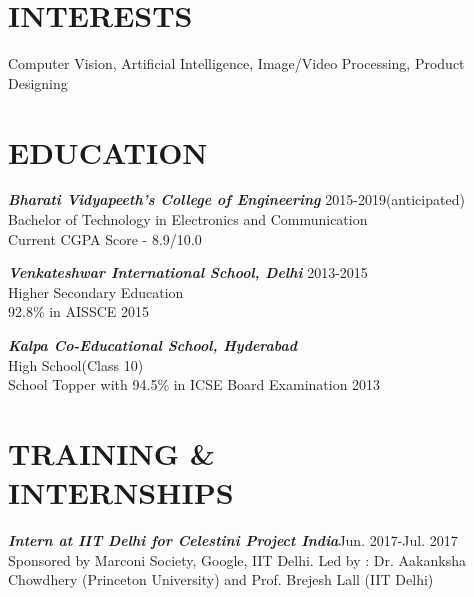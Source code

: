 \documentclass[margin, 10pt]{res} %
\begin{document}
\begin{resume}

 
\section{INTERESTS}  

Computer Vision, Artificial Intelligence, Image/Video Processing, Product Designing

\section{EDUCATION} 
{\sl \bf{Bharati Vidyapeeth's College of Engineering}} \hfill 2015-2019(anticipated)\\ Bachelor of Technology in Electronics and Communication\\
Current CGPA Score - 8.9/10.0

{\sl \bf{Venkateshwar International School, Delhi}}
\hfill 2013-2015 \\Higher Secondary Education\\ 92.8\% in AISSCE 2015

{\sl \bf{Kalpa Co-Educational School, Hyderabad}}\\High School(Class 10)\\School Topper with 94.5\% in ICSE Board Examination 2013


\section{TRAINING \& \\ INTERNSHIPS}
{\sl \bf{Intern at IIT Delhi for Celestini Project India}}\hfill Jun. 2017-Jul. 2017\\
Sponsored by Marconi Society, Google, IIT Delhi. Led by : Dr. Aakanksha Chowdhery (Princeton University) and Prof. Brejesh Lall (IIT Delhi)


\end{resume}
\end{document}
